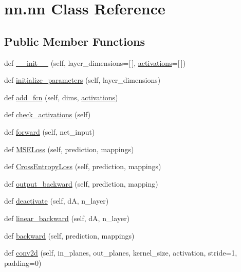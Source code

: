 \hypertarget{classnn_1_1nn}{}\section{nn.\+nn Class Reference}
\label{classnn_1_1nn}
\subsection*{Public Member Functions}
\begin{DoxyCompactItemize}
\item 
def \mbox{\hyperlink{classnn_1_1nn_a74489f9e02e4fca4de94ab099f3b28b4}{\+\_\+\+\_\+init\+\_\+\+\_\+}} (self, layer\+\_\+dimensions=\mbox{[}$\,$\mbox{]}, \mbox{\hyperlink{classnn_1_1nn_acb7fb4cc0db120b007ef1ab1f82d7ba0}{activations}}=\mbox{[}$\,$\mbox{]})
\item 
def \mbox{\hyperlink{classnn_1_1nn_a9821fed1369b4d709fe297fe9e07d97b}{initialize\+\_\+parameters}} (self, layer\+\_\+dimensions)
\item 
def \mbox{\hyperlink{classnn_1_1nn_a6d616cb56588767f5ce1c20d6b7c6bc0}{add\+\_\+fcn}} (self, dims, \mbox{\hyperlink{classnn_1_1nn_acb7fb4cc0db120b007ef1ab1f82d7ba0}{activations}})
\item 
def \mbox{\hyperlink{classnn_1_1nn_a15ee3f3e18ebae83c904b3441ece897d}{check\+\_\+activations}} (self)
\item 
def \mbox{\hyperlink{classnn_1_1nn_ae07002745b03901814d92ac66fe87781}{forward}} (self, net\+\_\+input)
\item 
def \mbox{\hyperlink{classnn_1_1nn_ae74a0f21e8722ea82a0f94135a81a348}{M\+S\+E\+Loss}} (self, prediction, mappings)
\item 
def \mbox{\hyperlink{classnn_1_1nn_a822299322a0b513f8985e61096be45bc}{Cross\+Entropy\+Loss}} (self, prediction, mappings)
\item 
def \mbox{\hyperlink{classnn_1_1nn_afa7d1462872fae95fe71f27ed00bf7ae}{output\+\_\+backward}} (self, prediction, mapping)
\item 
def \mbox{\hyperlink{classnn_1_1nn_a475811849fd370a47eb0e3b7bc09b283}{deactivate}} (self, dA, n\+\_\+layer)
\item 
def \mbox{\hyperlink{classnn_1_1nn_a0863e90359fa30486c7161cd31c5b4e7}{linear\+\_\+backward}} (self, dA, n\+\_\+layer)
\item 
def \mbox{\hyperlink{classnn_1_1nn_a53a7beb698fe127ebb1f636fccbaa126}{backward}} (self, prediction, mappings)
\item 
def \mbox{\hyperlink{classnn_1_1nn_a6d25d703f48b59a7c1888a364ab562e2}{conv2d}} (self, in\+\_\+planes, out\+\_\+planes, kernel\+\_\+size, activation, stride=1, padding=0)

\end{DoxyCompactItemize}
